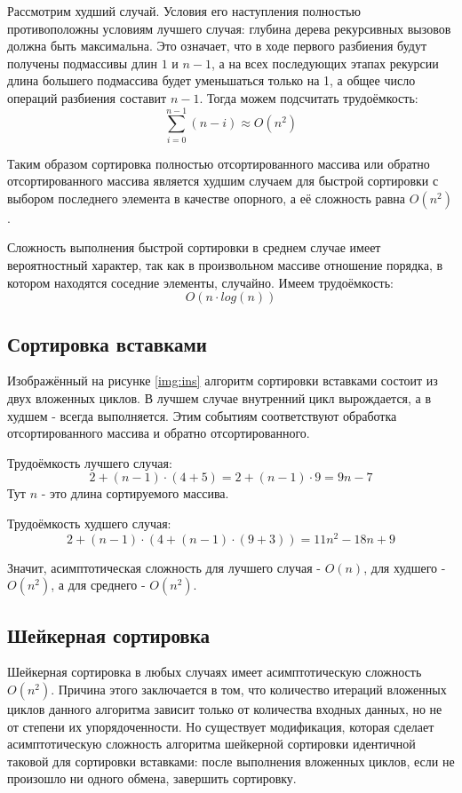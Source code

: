 Рассмотрим худший случай. Условия его наступления полностью противоположны условиям лучшего случая: глубина дерева рекурсивных вызовов должна быть максимальна. Это означает, что в ходе первого разбиения будут получены подмассивы длин $1$ и $n - 1$, а на всех последующих этапах рекурсии длина большего подмассива будет уменьшаться только на 1, а общее число операций разбиения составит $n - 1$. Тогда можем подсчитать трудоёмкость:
\begin{equation}
    \sum_{i = 0}^{n - 1}(n - i) \approx O(n^2)
\end{equation}

Таким образом сортировка полностью отсортированного массива или обратно отсортированного массива является худшим случаем для быстрой сортировки с выбором последнего элемента в качестве опорного, а её сложность равна $O(n^2)$.

Сложность выполнения быстрой сортировки в среднем случае имеет вероятностный характер, так как в произвольном массиве отношение порядка, в котором находятся соседние элементы, случайно. Имеем трудоёмкость\cite{knuth}:
\begin{equation}
    O(n \cdot{} log(n))
\end{equation}

\subsection{Сортировка вставками}
Изображённый на рисунке \ref{img:ins} алгоритм сортировки вставками состоит из двух вложенных циклов. В лучшем случае внутренний цикл вырождается, а в худшем - всегда выполняется. Этим событиям соответствуют обработка отсортированного массива и обратно отсортированного.

Трудоёмкость лучшего случая:
\begin{equation}
    2 + (n - 1) \cdot{} (4 + 5) = 2 + (n - 1) \cdot{} 9 = 9n - 7
\end{equation}
Тут $n$ - это длина сортируемого массива.

Трудоёмкость худшего случая:
\begin{equation}
    2 + (n - 1) \cdot{} (4 + (n - 1) \cdot{} (9 + 3)) = 11n^2 - 18n + 9
\end{equation}

Значит, асимптотическая сложность для лучшего случая - $O(n)$, для худшего - $O(n^2)$, а для среднего - $O(n^2)$\cite{knuth}.

\subsection{Шейкерная сортировка}
Шейкерная сортировка в любых случаях имеет асимптотическую сложность $O(n^2)$\cite{knuth}. Причина этого заключается в том, что количество итераций вложенных циклов данного алгоритма зависит только от количества входных данных, но не от степени их упорядоченности. Но существует модификация, которая сделает асимптотическую сложность алгоритма шейкерной сортировки идентичной таковой для сортировки вставками: после выполнения вложенных циклов, если не произошло ни одного обмена, завершить сортировку.

